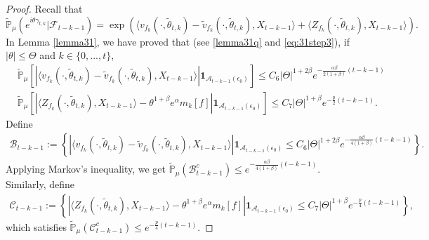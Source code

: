 \documentclass[12pt,oneside,english]{amsart}
\theoremstyle{plain}
\theoremstyle{definition}
\numberwithin{equation}{section}
\begin{document}
\begin{proof}
    Recall that
    $$\mathbb{\tilde{P}}_{\mu}\left(e^{i\theta \gamma_{t,k}}|\mathcal{F}_{t-k-1}\right)=\exp(\langle v_{f_k}(\cdot,\tilde{\theta}_{t,k})-\tilde{v}_{f_k}(\cdot, \tilde{\theta}_{t,k}),X_{t-k-1}\rangle+\langle Z_{f_k}(\cdot,\tilde{\theta}_{t,k}),X_{t-k-1}\rangle).$$
    In Lemma \ref{lemma31}, we have proved that (see \eqref{lemma31q} and \eqref{eq:31step3}), if $|\theta|\leq\Theta$ and $k\in\{0,...,t\}$,
    \begin{align*}
        &\mathbb{\tilde{P}}_{\mu}\left[\left|\langle v_{f_k}(\cdot,\tilde{\theta}_{t,k})-\tilde{v}_{f_k}(\cdot,\tilde{\theta}_{t,k}), X_{t-k-1}\rangle\right|\mathbf{1}_{\mathcal{A}_{t-k-1}(\epsilon_0)}\right]\leq C_{6}|\Theta|^{1+2\beta} e^{-\frac{\alpha\beta}{2(1+\beta)}(t-k-1)}\\
        &\mathbb{\tilde{P}}_{\mu}\left[\left|\langle Z_{f_k}(\cdot,\tilde{\theta}_{t,k}),X_{t-k-1}\rangle-\theta^{1+\beta}e^{\alpha}m_k[f]\right|\mathbf{1}_{\mathcal{A}_{t-k-1}(\epsilon_0)}\right]\leq C_7|\Theta|^{1+\beta} e^{-\frac{p}{2}(t-k-1)}.
    \end{align*}
 Define
\begin{align*}
    \mathcal{B}_{t-k-1}:=\left\{\left|\langle v_{f_k}(\cdot,\tilde{\theta}_{t,k})-\tilde{v}_{f_k}(\cdot,\tilde{\theta}_{t,k}), X_{t-k-1}\rangle\right|\mathbf{1}_{\mathcal{A}_{t-k-1}(\epsilon_0)}\leq C_6|\Theta|^{1+2\beta} e^{-\frac{\alpha\beta}{4(1+\beta)}(t-k-1)}\right\}.
\end{align*}
Applying Markov's inequality, we get $\mathbb{\tilde{P}}_{\mu}(\mathcal{B}^c_{t-k-1})\leq e^{-\frac{\alpha\beta}{4(1+\beta)}(t-k-1)}$. Similarly, define
\begin{align*}
    \mathcal{C}_{t-k-1}:=\left\{\left|\langle Z_{f_k}(\cdot,\tilde{\theta}_{t,k}),X_{t-k-1}\rangle-\theta^{1+\beta}e^{\alpha}m_k[f]\right|\mathbf{1}_{\mathcal{A}_{t-k-1}(\epsilon_0)}\leq C_7|\Theta|^{1+\beta} e^{-\frac{p}{4}(t-k-1)}\right\},
\end{align*}
 which satisfies  $\mathbb{\tilde{P}}_{\mu}(\mathcal{C}^c_{t-k-1})\leq e^{-\frac{p}{4}(t-k-1)}$.


\end{proof}
\end{document}
